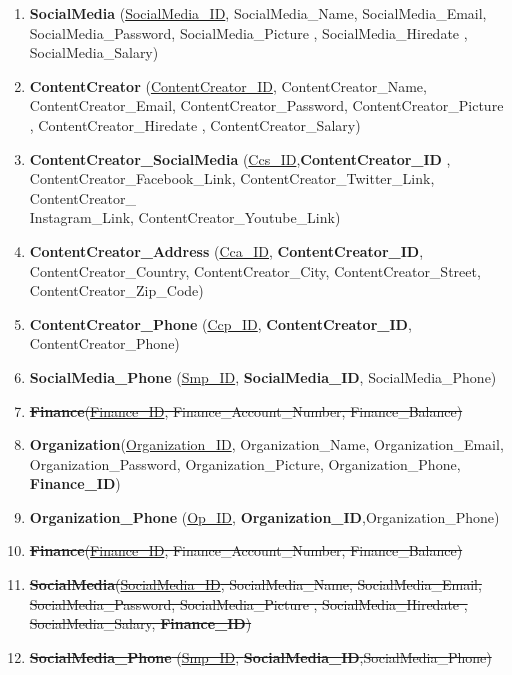 \begin{enumerate}
    \item \textbf{SocialMedia} (\underline{SocialMedia\_ID}, SocialMedia\_Name, SocialMedia\_Email, SocialMedia\_Password, SocialMedia\_Picture , SocialMedia\_Hiredate , SocialMedia\_Salary)
    \item \textbf{ContentCreator} (\underline{ContentCreator\_ID}, ContentCreator\_Name, ContentCreator\_Email, ContentCreator\_Password, ContentCreator\_Picture , ContentCreator\_Hiredate , ContentCreator\_Salary)
    \item \textbf{ContentCreator\_SocialMedia} (\underline{Ccs\_ID},\textbf{ContentCreator\_ID} , ContentCreator\_Facebook\_Link, ContentCreator\_Twitter\_Link, ContentCreator\_\\Instagram\_Link, ContentCreator\_Youtube\_Link)
    \item \textbf{ContentCreator\_Address} (\underline{Cca\_ID}, \textbf{ContentCreator\_ID}, ContentCreator\_Country, ContentCreator\_City, ContentCreator\_Street, ContentCreator\_Zip\_Code)
    \item \textbf{ContentCreator\_Phone} (\underline{Ccp\_ID}, \textbf{ContentCreator\_ID}, ContentCreator\_Phone)
    \item \textbf{SocialMedia\_Phone} (\underline{Smp\_ID}, \textbf{SocialMedia\_ID}, SocialMedia\_Phone)

    \item \sout{\textbf{Finance}(\underline{Finance\_ID}, Finance\_Account\_Number, Finance\_Balance)}
    \item \textbf{Organization}(\underline{Organization\_ID}, Organization\_Name, Organization\_Email, Organization\_Password, Organization\_Picture, Organization\_Phone, \textbf{Finance\_ID})
    \item \textbf{Organization\_Phone} (\underline{Op\_ID}, \textbf{Organization\_ID},{Organization\_Phone})


    \item \sout{\textbf{Finance}(\underline{Finance\_ID}, Finance\_Account\_Number, Finance\_Balance)}
    \item \sout{\textbf{SocialMedia}(\underline{SocialMedia\_ID}, SocialMedia\_Name, SocialMedia\_Email, SocialMedia\_Password, SocialMedia\_Picture ,  SocialMedia\_Hiredate , SocialMedia\_Salary, \textbf{Finance\_ID})}
    \item \sout{\textbf{SocialMedia\_Phone} (\underline{Smp\_ID}, \textbf{SocialMedia\_ID},{SocialMedia\_Phone})}




\end{enumerate}
